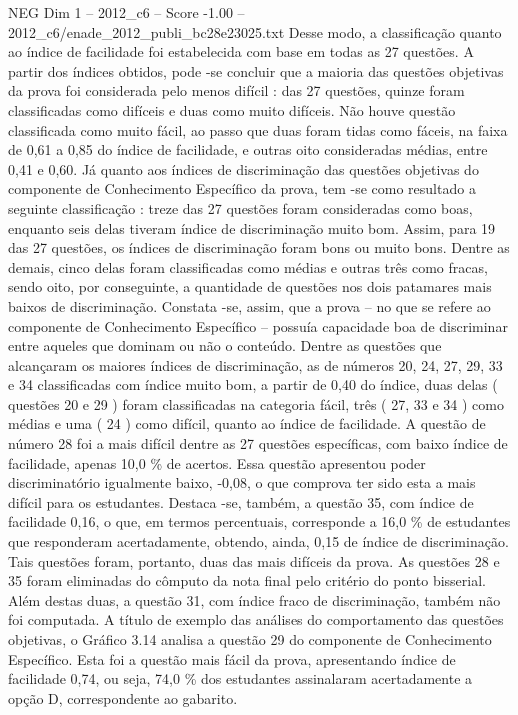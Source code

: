 \begin{textsample}{NEG Dim 1 – 2012\_c6 – Score -1.00 – 2012\_c6/enade\_2012\_publi\_bc28e23025.txt}
Desse modo, a classificação quanto ao índice de facilidade foi estabelecida com base em todas as 27 questões.
A partir dos índices obtidos, pode -se concluir que a maioria das questões objetivas da prova foi considerada pelo menos difícil : das 27 questões, quinze foram classificadas como difíceis e duas como muito difíceis.
Não houve questão classificada como muito fácil, ao passo que duas foram tidas como fáceis, na faixa de 0,61 a 0,85 do índice de facilidade, e outras oito consideradas médias, entre 0,41 e 0,60.
Já quanto aos índices de discriminação das questões objetivas do componente de Conhecimento Específico da prova, tem -se como resultado a seguinte classificação : treze das 27 questões foram consideradas como boas, enquanto seis delas tiveram índice de discriminação muito bom.
Assim, para 19 das 27 questões, os índices de discriminação foram bons ou muito bons.
Dentre as demais, cinco delas foram classificadas como médias e outras três como fracas, sendo oito, por conseguinte, a quantidade de questões nos dois patamares mais baixos de discriminação.
Constata -se, assim, que a prova – no que se refere ao componente de Conhecimento Específico – possuía capacidade boa de discriminar entre aqueles que dominam ou não o conteúdo.
Dentre as questões que alcançaram os maiores índices de discriminação, as de números 20, 24, 27, 29, 33 e 34 classificadas com índice muito bom, a partir de 0,40 do índice, duas delas ( questões 20 e 29 ) foram classificadas na categoria fácil, três ( 27, 33 e 34 ) como médias e uma ( 24 ) como difícil, quanto ao índice de facilidade.
A questão de número 28 foi a mais difícil dentre as 27 questões específicas, com baixo índice de facilidade, apenas 10,0 \% de acertos.
Essa questão apresentou poder discriminatório igualmente baixo, -0,08, o que comprova ter sido esta a mais difícil para os estudantes.
Destaca -se, também, a questão 35, com índice de facilidade 0,16, o que, em termos percentuais, corresponde a 16,0 \% de estudantes que responderam acertadamente, obtendo, ainda, 0,15 de índice de discriminação.
Tais questões foram, portanto, duas das mais difíceis da prova.
As questões 28 e 35 foram eliminadas do cômputo da nota final pelo critério do ponto bisserial.
Além destas duas, a questão 31, com índice fraco de discriminação, também não foi computada.
A título de exemplo das análises do comportamento das questões objetivas, o Gráfico 3.14 analisa a questão 29 do componente de Conhecimento Específico.
Esta foi a questão mais fácil da prova, apresentando índice de facilidade 0,74, ou seja, 74,0 \% dos estudantes assinalaram acertadamente a opção D, correspondente ao gabarito.

\end{textsample}
